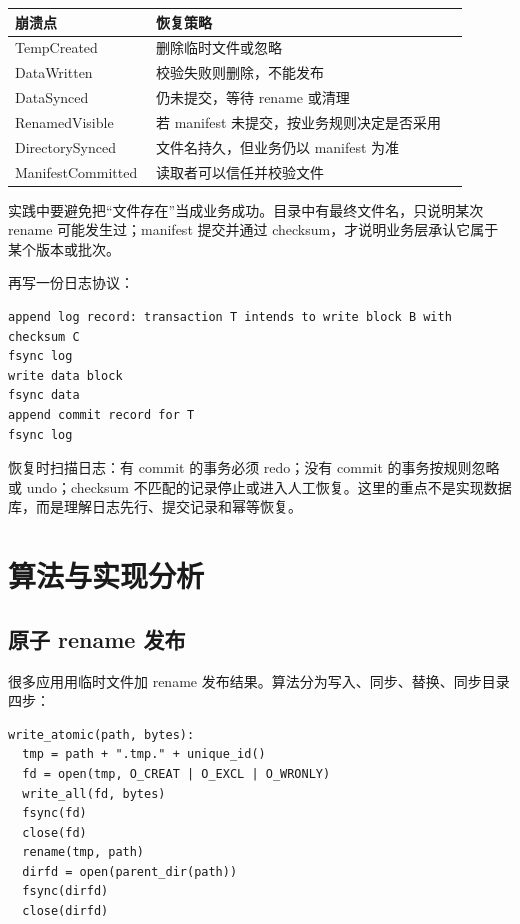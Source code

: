 \begin{longtable}{|p{0.24\linewidth}|p{0.66\linewidth}|}
\toprule
崩溃点 & 恢复策略 \\
\midrule
TempCreated & 删除临时文件或忽略 \\\tablerowrule
DataWritten & 校验失败则删除，不能发布 \\\tablerowrule
DataSynced & 仍未提交，等待 rename 或清理 \\\tablerowrule
RenamedVisible & 若 manifest 未提交，按业务规则决定是否采用 \\\tablerowrule
DirectorySynced & 文件名持久，但业务仍以 manifest 为准 \\\tablerowrule
ManifestCommitted & 读取者可以信任并校验文件 \\
\bottomrule
\end{longtable}

实践中要避免把“文件存在”当成业务成功。目录中有最终文件名，只说明某次 rename 可能发生过；manifest 提交并通过 checksum，才说明业务层承认它属于某个版本或批次。

再写一份日志协议：

\begin{lstlisting}
append log record: transaction T intends to write block B with checksum C
fsync log
write data block
fsync data
append commit record for T
fsync log
\end{lstlisting}

恢复时扫描日志：有 commit 的事务必须 redo；没有 commit 的事务按规则忽略或 undo；checksum 不匹配的记录停止或进入人工恢复。这里的重点不是实现数据库，而是理解日志先行、提交记录和幂等恢复。

\section{算法与实现分析}

\subsection{原子 rename 发布}

很多应用用临时文件加 rename 发布结果。算法分为写入、同步、替换、同步目录四步：

\begin{lstlisting}
write_atomic(path, bytes):
  tmp = path + ".tmp." + unique_id()
  fd = open(tmp, O_CREAT | O_EXCL | O_WRONLY)
  write_all(fd, bytes)
  fsync(fd)
  close(fd)
  rename(tmp, path)
  dirfd = open(parent_dir(path))
  fsync(dirfd)
  close(dirfd)
\end{lstlisting}

